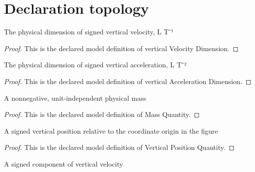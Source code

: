 \section{Declaration topology}
\begin{definition}
  \label{def:physics:phyx-mini-0810:phyxminiproblems-problemphyxmini0810-verticalvelocitydimension}
  The physical dimension of signed vertical velocity, L T⁻¹
\end{definition}
\begin{proof}
  This is the declared model definition of vertical Velocity Dimension.
\end{proof}
\begin{definition}
  \label{def:physics:phyx-mini-0810:phyxminiproblems-problemphyxmini0810-verticalaccelerationdimension}
  The physical dimension of signed vertical acceleration, L T⁻²
\end{definition}
\begin{proof}
  This is the declared model definition of vertical Acceleration Dimension.
\end{proof}
\begin{definition}
  \label{def:physics:phyx-mini-0810:phyxminiproblems-problemphyxmini0810-massquantity}
  A nonnegative, unit-independent physical mass
\end{definition}
\begin{proof}
  This is the declared model definition of Mass Quantity.
\end{proof}
\begin{definition}
  \label{def:physics:phyx-mini-0810:phyxminiproblems-problemphyxmini0810-verticalpositionquantity}
  A signed vertical position relative to the coordinate origin in the figure
\end{definition}
\begin{proof}
  This is the declared model definition of Vertical Position Quantity.
\end{proof}
\begin{definition}
  \label{def:physics:phyx-mini-0810:phyxminiproblems-problemphyxmini0810-verticalvelocityquantity}
  A signed component of vertical velocity
\end{definition}

